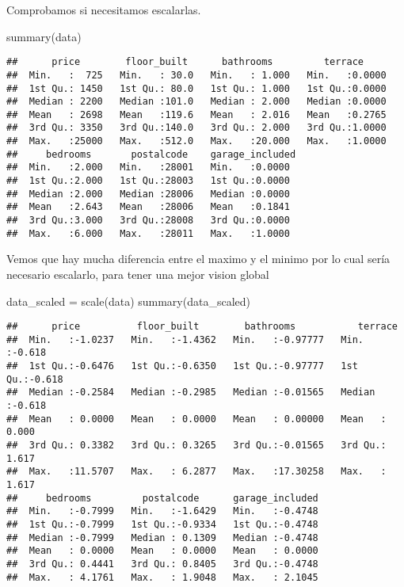 \documentclass[
]{article}
\newenvironment{Shaded}{\begin{snugshade}}{\end{snugshade}}
\newcommand{\FunctionTok}[1]{\textcolor[rgb]{0.00,0.00,0.00}{#1}}
\newcommand{\NormalTok}[1]{#1}
\newcommand{\OtherTok}[1]{\textcolor[rgb]{0.56,0.35,0.01}{#1}}
\begin{document}
Comprobamos si necesitamos escalarlas.

\begin{Shaded}
\begin{Highlighting}[]
\FunctionTok{summary}\NormalTok{(data)}
\end{Highlighting}
\end{Shaded}

\begin{verbatim}
##      price        floor_built      bathrooms         terrace      
##  Min.   :  725   Min.   : 30.0   Min.   : 1.000   Min.   :0.0000  
##  1st Qu.: 1450   1st Qu.: 80.0   1st Qu.: 1.000   1st Qu.:0.0000  
##  Median : 2200   Median :101.0   Median : 2.000   Median :0.0000  
##  Mean   : 2698   Mean   :119.6   Mean   : 2.016   Mean   :0.2765  
##  3rd Qu.: 3350   3rd Qu.:140.0   3rd Qu.: 2.000   3rd Qu.:1.0000  
##  Max.   :25000   Max.   :512.0   Max.   :20.000   Max.   :1.0000  
##     bedrooms       postalcode    garage_included 
##  Min.   :2.000   Min.   :28001   Min.   :0.0000  
##  1st Qu.:2.000   1st Qu.:28003   1st Qu.:0.0000  
##  Median :2.000   Median :28006   Median :0.0000  
##  Mean   :2.643   Mean   :28006   Mean   :0.1841  
##  3rd Qu.:3.000   3rd Qu.:28008   3rd Qu.:0.0000  
##  Max.   :6.000   Max.   :28011   Max.   :1.0000
\end{verbatim}

Vemos que hay mucha diferencia entre el maximo y el minimo por lo cual
sería necesario escalarlo, para tener una mejor vision global

\begin{Shaded}
\begin{Highlighting}[]
\NormalTok{data\_scaled }\OtherTok{=} \FunctionTok{scale}\NormalTok{(data)}
\FunctionTok{summary}\NormalTok{(data\_scaled)}
\end{Highlighting}
\end{Shaded}

\begin{verbatim}
##      price          floor_built        bathrooms           terrace      
##  Min.   :-1.0237   Min.   :-1.4362   Min.   :-0.97777   Min.   :-0.618  
##  1st Qu.:-0.6476   1st Qu.:-0.6350   1st Qu.:-0.97777   1st Qu.:-0.618  
##  Median :-0.2584   Median :-0.2985   Median :-0.01565   Median :-0.618  
##  Mean   : 0.0000   Mean   : 0.0000   Mean   : 0.00000   Mean   : 0.000  
##  3rd Qu.: 0.3382   3rd Qu.: 0.3265   3rd Qu.:-0.01565   3rd Qu.: 1.617  
##  Max.   :11.5707   Max.   : 6.2877   Max.   :17.30258   Max.   : 1.617  
##     bedrooms         postalcode      garage_included  
##  Min.   :-0.7999   Min.   :-1.6429   Min.   :-0.4748  
##  1st Qu.:-0.7999   1st Qu.:-0.9334   1st Qu.:-0.4748  
##  Median :-0.7999   Median : 0.1309   Median :-0.4748  
##  Mean   : 0.0000   Mean   : 0.0000   Mean   : 0.0000  
##  3rd Qu.: 0.4441   3rd Qu.: 0.8405   3rd Qu.:-0.4748  
##  Max.   : 4.1761   Max.   : 1.9048   Max.   : 2.1045
\end{verbatim}
\end{document}
